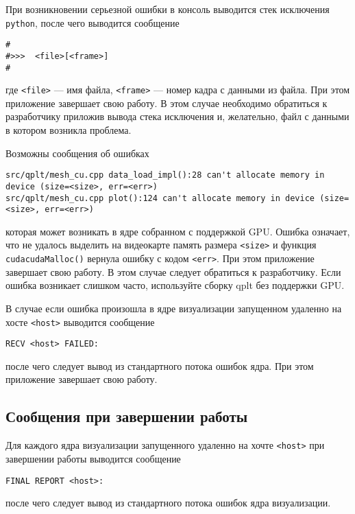 \documentclass[12pt]{article}
\begin{document}
При возникновении серьезной ошибки в консоль выводится стек исключения \verb'python',
после чего выводится сообщение
\begin{verbatim}
#
#>>>  <file>[<frame>]
#
\end{verbatim}
где \verb'<file>' --- имя файла, \verb'<frame>' --- номер кадра с данными из файла.
При этом приложение завершает свою работу.
В этом случае необходимо обратиться к разработчику приложив вывода стека исключения
и, желательно, файл с данными в котором возникла проблема.

Возможны сообщения об ошибках
\begin{verbatim}
src/qplt/mesh_cu.cpp data_load_impl():28 can't allocate memory in device (size=<size>, err=<err>)
src/qplt/mesh_cu.cpp plot():124 can't allocate memory in device (size=<size>, err=<err>)
\end{verbatim}
которая может возникать в ядре собранном с поддержкой GPU. Ошибка означает,  что не удалось выделить на видеокарте память размера \verb'<size>'
и функция \verb'cudacudaMalloc()' вернула ошибку с кодом \verb'<err>'. При этом приложение завершает свою работу.
В этом случае следует обратиться к разработчику. Если ошибка возникает слишком часто, используйте сборку qplt без поддержки GPU.

В случае если ошибка произошла в ядре визуализации запущенном удаленно на хосте \verb'<host>' выводится сообщение
\begin{verbatim}
RECV <host> FAILED:
\end{verbatim}
после чего следует вывод из стандартного потока ошибок ядра. При этом приложение завершает свою работу.

\subsection{Сообщения при завершении работы}
Для каждого ядра визуализации запущенного удаленно на хочте \verb'<host>' при завершении работы выводится сообщение
\begin{verbatim}
FINAL REPORT <host>:
\end{verbatim}
после чего следует вывод из стандартного потока ошибок ядра визуализации. 

\end{document}
